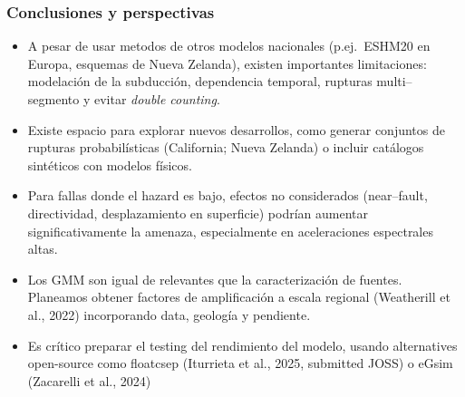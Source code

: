 \documentclass[9pt,ignorenonframetext,mathserif,aspectratio=169,xcolor=dvipsnames]{beamer}
\begin{document}
\begin{frame}[t]\frametitle{Conclusiones y perspectivas}

\begin{itemize}
  \item A pesar de usar metodos de otros modelos nacionales
        (p.ej.\ ESHM20 en Europa, esquemas de Nueva Zelanda), existen
        importantes limitaciones: modelación de la subducción, dependencia
        temporal, rupturas multi–segmento y evitar \emph{double counting}.

  \item Existe espacio para explorar nuevos desarrollos, como generar conjuntos de rupturas probabilísticas (California; Nueva Zelanda) o incluir catálogos sintéticos con modelos físicos.

  \item Para fallas donde el hazard es bajo, efectos no
        considerados (near–fault, directividad, desplazamiento
        en superficie) podrían aumentar significativamente la amenaza,
        especialmente en aceleraciones espectrales altas.

  \item Los GMM son igual de relevantes que la
        caracterización de fuentes. Planeamos obtener factores de amplificación a escala regional (Weatherill et al., 2022) incorporando data, geología y pendiente.
\item Es crítico preparar el testing del rendimiento del modelo, usando alternatives open-source como floatcsep (Iturrieta et al., 2025, submitted JOSS) o eGsim (Zacarelli et al., 2024)

\end{itemize}

\end{frame}
\end{document}
